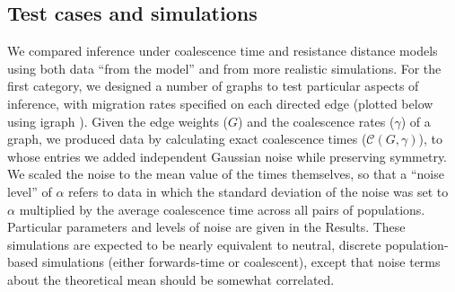 \documentclass{article}
\begin{document}
\subsection*{Test cases and simulations}

We compared inference under coalescence time and resistance distance models
using both data ``from the model'' and from more realistic simulations.
For the first category, we designed a number of graphs to test particular aspects of inference,
with migration rates specified on each directed edge
(plotted below using igraph \citep{igraph}).
Given the edge weights ($G$) and the coalescence rates ($\gamma$) of a graph,
we produced data by calculating exact coalescence times ($\mathcal{C}(G,\gamma)$),
to whose entries we added independent Gaussian noise while preserving symmetry.
We scaled the noise to the mean value of the times themselves,
so that a ``noise level'' of $\alpha$ refers to data in which the standard deviation of the noise
was set to $\alpha$ multiplied by the average coalescence time across all pairs of populations.
Particular parameters and levels of noise are given in the Results.
These simulations are expected to be nearly equivalent to neutral, discrete population-based simulations
(either forwards-time or coalescent),
except that noise terms about the theoretical mean should be somewhat correlated.
\end{document}
